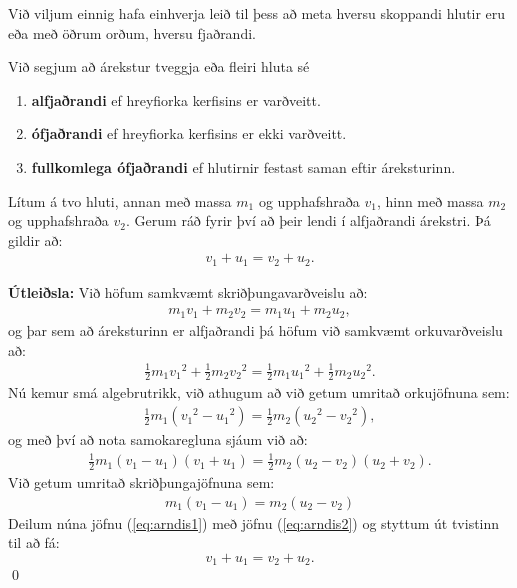\ifdefined \wholebook \else\documentclass[oneside]{book}\usepackage{EdlBook}\graphicspath{{figures/}}
\begin{document}
Við viljum einnig hafa einhverja leið til þess að meta hversu skoppandi hlutir eru eða með öðrum orðum, hversu fjaðrandi.

\begin{tcolorbox}
\begin{definition}
Við segjum að árekstur tveggja eða fleiri hluta sé
\begin{enumerate}[label = \textbf{(\roman*)}]
    \item \textbf{alfjaðrandi} ef hreyfiorka kerfisins er varðveitt.
    \item \textbf{ófjaðrandi} ef hreyfiorka kerfisins er ekki varðveitt.
    \item \textbf{fullkomlega ófjaðrandi} ef hlutirnir festast saman eftir áreksturinn.
\end{enumerate}
\end{definition}
\end{tcolorbox}



\begin{tcolorbox}
\begin{theorem}
Lítum á tvo hluti, annan með massa $m_1$ og upphafshraða $v_1$, hinn með massa $m_2$ og upphafshraða $v_2$. Gerum ráð fyrir því að þeir lendi í alfjaðrandi árekstri. Þá gildir að:
\begin{align*}
    v_1 + u_1 = v_2 + u_2.
\end{align*}
\end{theorem}
\end{tcolorbox}

\textbf{Útleiðsla:} Við höfum samkvæmt skriðþungavarðveislu að:
\begin{align*}
    m_1 v_1 + m_2 v_2 = m_1 u_1 + m_2 u_2,
\end{align*}
og þar sem að áreksturinn er alfjaðrandi þá höfum við samkvæmt orkuvarðveislu að:
\begin{align*}
    \frac{1}{2}m_1 {v_{1}}^2 + \frac{1}{2}m_2 {v_{2}}^2 = \frac{1}{2}m_1 {u_{1}}^2 + \frac{1}{2}m_2 {u_{2}}^2.
\end{align*}
Nú kemur smá algebrutrikk, við athugum að við getum umritað orkujöfnuna sem:
\begin{align*}
    \frac{1}{2}m_1\left({v_1}^2 - {u_1}^2 \right) = \frac{1}{2}m_2 \left( {u_2}^2 - {v_2}^2 \right),
\end{align*}
og með því að nota samokaregluna sjáum við að:
\begin{align} \label{eq:arndis1}
    \frac{1}{2}m_1 \left( v_1 - u_1 \right)\left( v_1 + u_1 \right) = \frac{1}{2}m_2 \left( u_2 - v_2 \right) \left( u_2 + v_2 \right).
\end{align}
Við getum umritað skriðþungajöfnuna sem:
\begin{align} \label{eq:arndis2}
    m_1 \left( v_1 - u_1 \right) = m_2 \left( u_2 - v_2 \right)
\end{align}
Deilum núna jöfnu (\ref{eq:arndis1}) með jöfnu (\ref{eq:arndis2}) og styttum út tvistinn til að fá:
\begin{equation*}
    v_1 + u_1 = v_2 + u_2.
\end{equation*}
\qed
\end{document}
